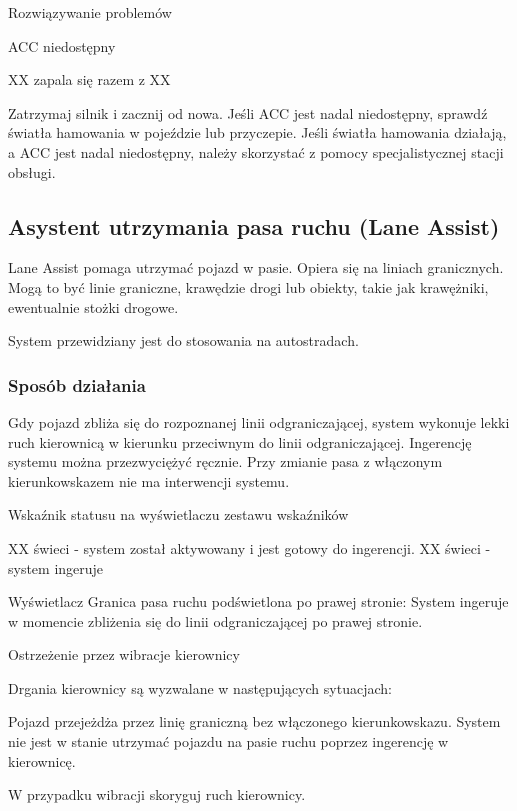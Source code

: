 Rozwiązywanie problemów

ACC niedostępny

XX zapala się razem z XX

\begin{itemizeArrow}
	\itemArrow Zatrzymaj silnik i zacznij od nowa.
	\itemArrow Jeśli ACC jest nadal niedostępny, sprawdź światła hamowania w pojeździe lub przyczepie.
	\itemArrow Jeśli światła hamowania działają, a ACC jest nadal niedostępny, należy skorzystać z pomocy specjalistycznej stacji obsługi.
\end{itemizeArrow}

\subsection{Asystent utrzymania pasa ruchu (Lane Assist)}

Lane Assist pomaga utrzymać pojazd w pasie. Opiera się na liniach granicznych. Mogą to być linie graniczne, krawędzie drogi lub obiekty, takie jak krawężniki, ewentualnie stożki drogowe.

System przewidziany jest do stosowania na autostradach.

\subsubsection{Sposób działania}

Gdy pojazd zbliża się do rozpoznanej linii odgraniczającej, system wykonuje lekki ruch kierownicą w kierunku przeciwnym do linii odgraniczającej. Ingerencję systemu można przezwyciężyć ręcznie.
Przy zmianie pasa z włączonym kierunkowskazem nie ma interwencji systemu.

Wskaźnik statusu na wyświetlaczu zestawu wskaźników

XX świeci - system został aktywowany i jest gotowy do ingerencji.
XX świeci - system ingeruje

Wyświetlacz
Granica pasa ruchu podświetlona po prawej stronie: System ingeruje w momencie zbliżenia się do linii odgraniczającej po prawej stronie.

Ostrzeżenie przez wibracje kierownicy

Drgania kierownicy są wyzwalane w następujących sytuacjach:
\begin{itemizeTriangle}
	\itemTriangle Pojazd przejeżdża przez linię graniczną bez włączonego kierunkowskazu.
	\itemTriangle System nie jest w stanie utrzymać pojazdu na pasie ruchu poprzez ingerencję w kierownicę.
	\begin{itemizeArrow}
		\itemArrow W przypadku wibracji skoryguj ruch kierownicy.
	\end{itemizeArrow}
\end{itemizeTriangle}

